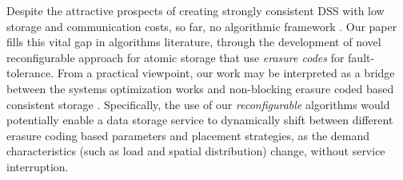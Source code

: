 Despite the attractive prospects of creating strongly consistent DSS with low storage and communication costs, so far,   no algorithmic framework . Our paper fills this vital gap in algorithms literature, 
through the development of novel reconfigurable approach for atomic storage that use \emph{erasure codes} for fault-tolerance. 
From a practical viewpoint, our work may be interpreted as a bridge between the systems optimization works \cite{PARS, EC-Store, EC-Cache, WPS, xiang2016joint, joshi2017efficient, xiang2015multi,yu2018sp} and non-blocking erasure coded based consistent storage \cite{CT06, CadambeLMM17,  DGL08, SODA2016, radon, GIZA2017, Zhang2016}. Specifically, the use of our \emph{reconfigurable} algorithms would potentially enable a data storage service to dynamically shift between different erasure coding based parameters and placement strategies, as the demand characteristics (such as load and spatial distribution) change, without service interruption.


